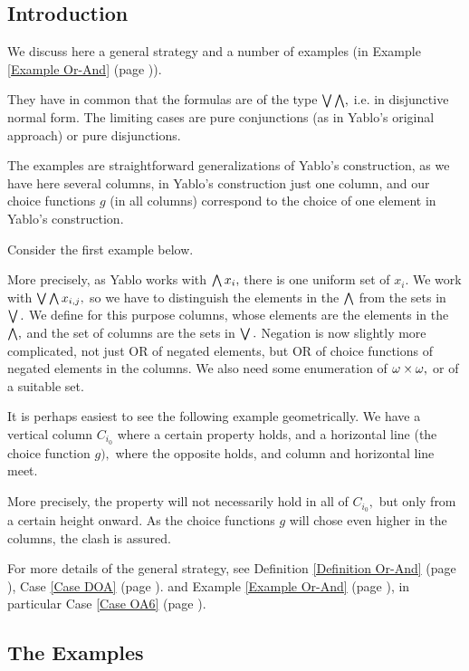 \label{Section Or-And}
\subsection{
Introduction
}


\ee


We discuss here a general strategy and a number of examples
(in Example \ref{Example Or-And} (page \pageref{Example Or-And})).

They have in common that the formulas are of the type $ \bigvee \bigwedge,$ i.e.
in
disjunctive normal form. The limiting cases are pure conjunctions
(as in Yablo's original approach) or pure disjunctions.

The examples are straightforward generalizations of Yablo's construction,
as we have here several columns, in Yablo's construction just one
column, and our choice functions $g$ (in all columns) correspond to the
choice
of one element in Yablo's construction.

Consider the first example below.

More precisely, as Yablo works with $ \bigwedge x_{i},$ there is one uniform
set of $x_{i}.$
We work with $ \bigvee \bigwedge x_{i,j},$ so we have to distinguish the elements
in the $ \bigwedge $
from the sets in $ \bigvee.$ We define for this purpose columns, whose
elements
are the elements in the $ \bigwedge,$ and the set of columns are the sets in $
\bigvee.$
Negation is now slightly more complicated, not just OR of negated
elements,
but
OR of choice functions of negated elements in the columns.
We also need some enumeration of $ \omega \times \omega,$ or of a suitable set.

It is perhaps easiest to see the following example geometrically.
We have a vertical column $C_{i_{0}}$ where a certain property holds,
and a horizontal line (the choice function $g),$ where the opposite
holds, and column and horizontal line meet.

More precisely, the property will not necessarily hold in all of
$C_{i_{0}},$
but only from a certain height onward. As the choice functions $g$ will
chose even higher in the columns, the clash is assured.

For more details of the general strategy, see
Definition \ref{Definition Or-And} (page \pageref{Definition Or-And}),
Case \ref{Case DOA} (page \pageref{Case DOA}).
and
Example \ref{Example Or-And} (page \pageref{Example Or-And}),
in particular
Case \ref{Case OA6} (page \pageref{Case OA6}).
\subsection{
The Examples
}



